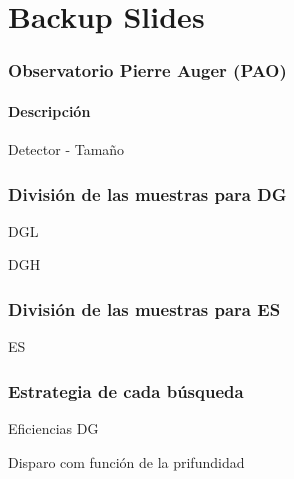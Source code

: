 \section{Backup Slides}

\frame{\sectionpage}

	
\begin{frame}
\frametitle{Observatorio Pierre Auger (PAO)}
\framesubtitle{Descripci\'on}
	\begin{block}{Detector - Tama\~no}
		\begin{center}
		\end{center}
	\end{block}
\end{frame}

\begin{frame}
 \frametitle{Divisi\'on de las muestras para DG}
	\begin{block}{DGL}
		\begin{center}
		\end{center}
	\end{block}
	\begin{block}{DGH}
		\begin{center}
		\end{center}
	\end{block}
\end{frame}

\begin{frame}
 \frametitle{Divisi\'on de las muestras para ES}
	\begin{block}{ES}
		\begin{center}	 
		\end{center}
	\end{block}
\end{frame}


\begin{frame}
 \frametitle{Estrategia de cada b\'usqueda}
 \begin{center}
 \end{center}
\end{frame}

\begin{frame}{Eficiencias DG}
	\begin{block}{Disparo com funci\'on de la prifundidad}
		\begin{center}
		\end{center}
	\end{block}
\end{frame}

